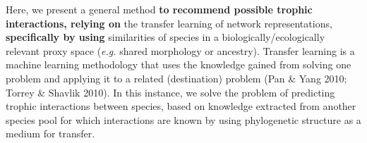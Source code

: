 \documentclass[11pt]{article}
\makeatletter
\def\maxwidth{\ifdim\Gin@nat@width>\linewidth\linewidth
\else\Gin@nat@width\fi}
\let\Oldincludegraphics\includegraphics
\renewcommand{\includegraphics}[1]{\Oldincludegraphics[width=\maxwidth]{#1}}
\providecommand{\DIFaddtex}[1]{{\bf #1}} %
\providecommand{\DIFdeltex}[1]{} %
\providecommand{\DIFaddbegin}{\protect\color{blue}} %
\providecommand{\DIFaddend}{\protect\color{black}} %
\providecommand{\DIFdelbegin}{\protect\color{red}} %
\providecommand{\DIFdelend}{\protect\color{black}} %
\providecommand{\DIFadd}[1]{\texorpdfstring{\DIFaddtex{#1}}{#1}} %
\providecommand{\DIFdel}[1]{\texorpdfstring{\DIFdeltex{#1}}{}} %
\newcommand{\DIFscaledelfig}{0.5}
\newlength{\DIFdelgraphicswidth} %
\newlength{\DIFdelgraphicsheight} %
\newcommand{\DIFaddincludegraphics}[2][]{{\color{blue}\fbox{\DIFOincludegraphics[#1]{#2}}}} %
\newcommand{\DIFdelincludegraphics}[2][]{%
\sbox{\DIFdelgraphicsbox}{\DIFOincludegraphics[#1]{#2}}%
\settoboxwidth{\DIFdelgraphicswidth}{\DIFdelgraphicsbox} %
\settoboxtotalheight{\DIFdelgraphicsheight}{\DIFdelgraphicsbox} %
\scalebox{\DIFscaledelfig}{%
\parbox[b]{\DIFdelgraphicswidth}{\usebox{\DIFdelgraphicsbox}\\[-\baselineskip] \rule{\DIFdelgraphicswidth}{0em}}\llap{\resizebox{\DIFdelgraphicswidth}{\DIFdelgraphicsheight}{%
\setlength{\unitlength}{\DIFdelgraphicswidth}%
\begin{picture}(1,1)%
\thicklines\linethickness{2pt} %
{\color[rgb]{1,0,0}\put(0,0){\framebox(1,1){}}}%
{\color[rgb]{1,0,0}\put(0,0){\line( 1,1){1}}}%
{\color[rgb]{1,0,0}\put(0,1){\line(1,-1){1}}}%
\end{picture}%
}\hspace*{3pt}}} %
} %
\DeclareRobustCommand{\DIFaddbegin}{\DIFOaddbegin \let\includegraphics\DIFaddincludegraphics} %
\DeclareRobustCommand{\DIFaddend}{\DIFOaddend \let\includegraphics\DIFOincludegraphics} %
\DeclareRobustCommand{\DIFdelbegin}{\DIFOdelbegin \let\includegraphics\DIFdelincludegraphics} %
\DeclareRobustCommand{\DIFdelend}{\DIFOaddend \let\includegraphics\DIFOincludegraphics} %
\makeatother
\begin{document}
Here, we present a general method \DIFdelbegin \DIFdel{for }\DIFdelend \DIFaddbegin \DIFadd{to recommend possible trophic
interactions, relying on }\DIFaddend the transfer learning of network
representations, \DIFdelbegin \DIFdel{relying on the }\DIFdelend \DIFaddbegin \DIFadd{specifically by using }\DIFaddend similarities of species in a
biologically/ecologically relevant proxy space (\emph{e.g.} shared
morphology or ancestry). Transfer learning is a machine learning
methodology that uses the knowledge gained from solving one problem and
applying it to a related (destination) problem (Pan \& Yang 2010; Torrey
\& Shavlik 2010). In this instance, we solve the problem of predicting
trophic interactions between species, based on knowledge extracted from
another species pool for which interactions are known by using
phylogenetic structure as a medium for transfer. \DIFdelbegin \DIFdel{This allows us to
construct a \emph{probabilistic} metaweb for a community for which we
have \emph{no} prior trophic interaction data for the desired species
pool. Our methodology is outlined in fig.~\ref{fig:concept}, where we
provide an illustration based on learning the embedding of a metaweb of
trophic interactions for European mammals (known interactions; Maiorano
\emph{et al.} 2020b, a) and, based on phylogenetic relationships between
mammals globally (\emph{i.e.}, phylogenetic tree Upham \emph{et al.}
2019), infer a metaweb for the Canadian mammalian species pool
(interactions are treated as unknown in this instance).
}%

\end{document}
